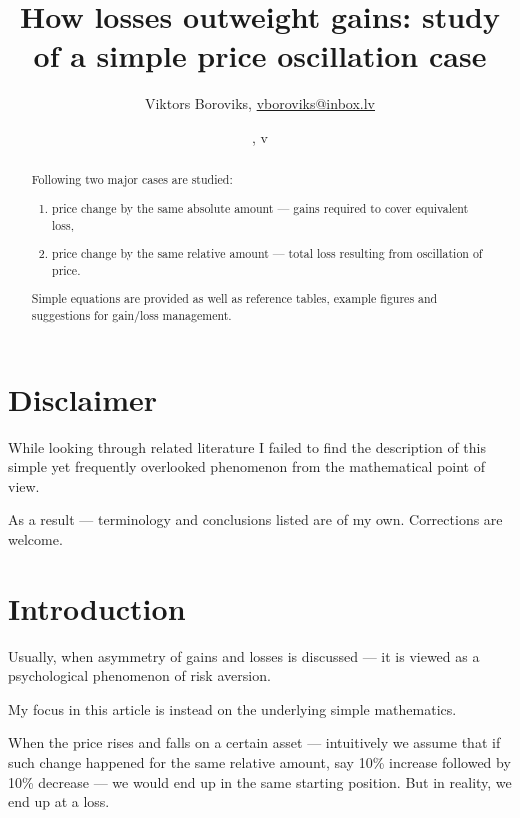 \documentclass[a4paper]{article}
\begin{document}
\title{How losses outweight gains: study of a simple price oscillation case}
\author{Viktors Boroviks, \href{mailto:vboroviks@inbox.lv}{vboroviks@inbox.lv}}
\date{\vhCurrentDate, v\vhCurrentVersion}
\maketitle

\setcounter{page}{1}

\begin{abstract}

Following two major cases are studied:

\begin{enumerate}
\item price change by the same absolute amount --- gains required to cover equivalent loss,
\item price change by the same relative amount --- total loss resulting from oscillation of price.
\end{enumerate}

Simple equations are provided as well as reference tables, example figures
and suggestions for gain/loss management.

\end{abstract}


\section*{Disclaimer}

While looking through related literature I failed to find the description
of this simple yet frequently overlooked phenomenon from the mathematical
point of view.

As a result --- terminology and conclusions listed are of my own.
Corrections are welcome.

\section*{Introduction}

Usually, when asymmetry of gains and losses is discussed --- it is viewed
as a psychological phenomenon of risk aversion.

My focus in this article is instead on the underlying simple mathematics.

When the price rises and falls on a certain asset --- intuitively we assume
that if such change happened for the same relative amount, say 10\% increase
followed by 10\% decrease --- we would end up in the same starting position.
But in reality, we end up at a loss.
\end{document}
